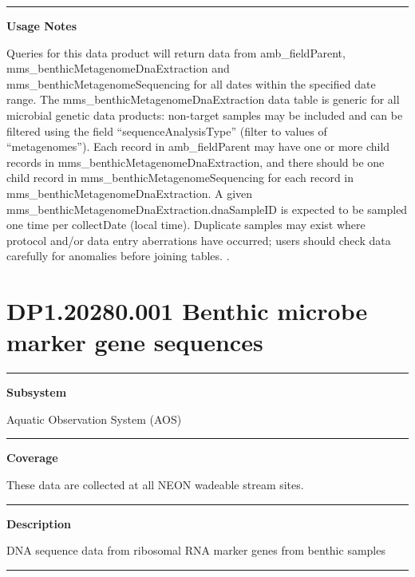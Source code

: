 \documentclass[]{article}
\begin{document}
\begin{center}\rule{0.5\linewidth}{\linethickness}\end{center}

\textbf{Usage Notes}

Queries for this data product will return data from amb\_fieldParent,
mms\_benthicMetagenomeDnaExtraction and mms\_benthicMetagenomeSequencing
for all dates within the specified date range. The
mms\_benthicMetagenomeDnaExtraction data table is generic for all
microbial genetic data products: non-target samples may be included and
can be filtered using the field ``sequenceAnalysisType'' (filter to
values of ``metagenomes''). Each record in amb\_fieldParent may have one
or more child records in mms\_benthicMetagenomeDnaExtraction, and there
should be one child record in mms\_benthicMetagenomeSequencing for each
record in mms\_benthicMetagenomeDnaExtraction. A given
mms\_benthicMetagenomeDnaExtraction.dnaSampleID is expected to be
sampled one time per collectDate (local time). Duplicate samples may
exist where protocol and/or data entry aberrations have occurred; users
should check data carefully for anomalies before joining tables.
\newpage
.

\section{DP1.20280.001 Benthic microbe marker gene
sequences}\label{dp1.20280.001-benthic-microbe-marker-gene-sequences}

\begin{center}\rule{0.5\linewidth}{\linethickness}\end{center}

\textbf{Subsystem}

Aquatic Observation System (AOS)

\begin{center}\rule{0.5\linewidth}{\linethickness}\end{center}

\textbf{Coverage}

These data are collected at all NEON wadeable stream sites.

\begin{center}\rule{0.5\linewidth}{\linethickness}\end{center}

\textbf{Description}

DNA sequence data from ribosomal RNA marker genes from benthic samples

\begin{center}\rule{0.5\linewidth}{\linethickness}\end{center}
\end{document}

